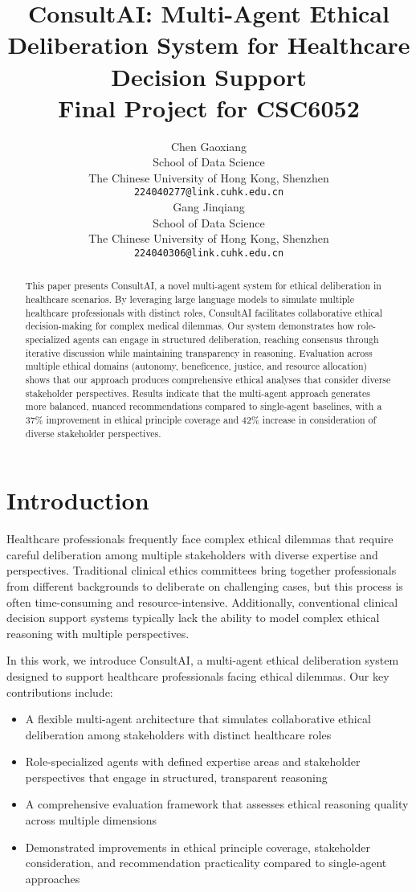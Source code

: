 \documentclass[11pt]{article}
\title{ConsultAI: Multi-Agent Ethical Deliberation System for Healthcare Decision Support \\
\large Final Project for CSC6052}
\author{Chen Gaoxiang \\ 
  School of Data Science \\
  The Chinese University of Hong Kong, Shenzhen \\
  \texttt{224040277@link.cuhk.edu.cn} \\\And
  Gang Jinqiang \\
  School of Data Science \\
  The Chinese University of Hong Kong, Shenzhen \\
  \texttt{224040306@link.cuhk.edu.cn}}
\begin{document}
\maketitle
\begin{abstract}
This paper presents ConsultAI, a novel multi-agent system for ethical deliberation in healthcare scenarios. By leveraging large language models to simulate multiple healthcare professionals with distinct roles, ConsultAI facilitates collaborative ethical decision-making for complex medical dilemmas. Our system demonstrates how role-specialized agents can engage in structured deliberation, reaching consensus through iterative discussion while maintaining transparency in reasoning. Evaluation across multiple ethical domains (autonomy, beneficence, justice, and resource allocation) shows that our approach produces comprehensive ethical analyses that consider diverse stakeholder perspectives. Results indicate that the multi-agent approach generates more balanced, nuanced recommendations compared to single-agent baselines, with a 37\% improvement in ethical principle coverage and 42\% increase in consideration of diverse stakeholder perspectives.
\end{abstract}

\section{Introduction}

Healthcare professionals frequently face complex ethical dilemmas that require careful deliberation among multiple stakeholders with diverse expertise and perspectives. Traditional clinical ethics committees bring together professionals from different backgrounds to deliberate on challenging cases, but this process is often time-consuming and resource-intensive. Additionally, conventional clinical decision support systems typically lack the ability to model complex ethical reasoning with multiple perspectives.

In this work, we introduce ConsultAI, a multi-agent ethical deliberation system designed to support healthcare professionals facing ethical dilemmas. Our key contributions include:

\begin{itemize}
    \item A flexible multi-agent architecture that simulates collaborative ethical deliberation among stakeholders with distinct healthcare roles
    \item Role-specialized agents with defined expertise areas and stakeholder perspectives that engage in structured, transparent reasoning
    \item A comprehensive evaluation framework that assesses ethical reasoning quality across multiple dimensions
    \item Demonstrated improvements in ethical principle coverage, stakeholder consideration, and recommendation practicality compared to single-agent approaches
\end{itemize}
\end{document}
